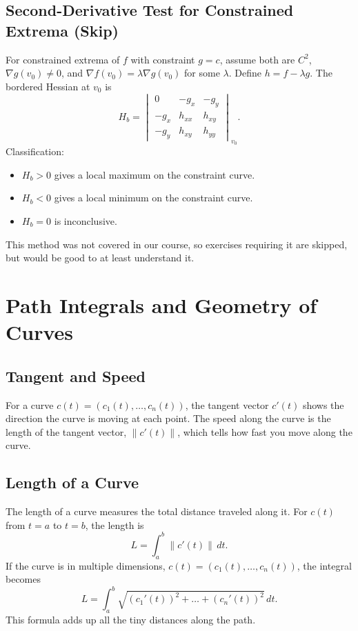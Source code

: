 \documentclass{article}
\begin{document}
\subsection{Second-Derivative Test for Constrained Extrema (Skip)}
For constrained extrema of $f$ with constraint $g=c$, assume both are $C^{2}$, $\nabla g(v_{0})\neq 0$, and $\nabla f(v_{0})=\lambda\nabla g(v_{0})$ for some $\lambda$. Define $h=f-\lambda g$. The bordered Hessian at $v_{0}$ is
\[H_b=\begin{vmatrix}0 & -g_x & -g_y \\-g_x & h_{xx} & h_{xy} \\-g_y & h_{xy} & h_{yy}\end{vmatrix}_{v_{0}}.\]
Classification:
\begin{itemize}
    \item $H_b>0$ gives a local maximum on the constraint curve.
    \item $H_b<0$ gives a local minimum on the constraint curve.
    \item $H_b=0$ is inconclusive.
\end{itemize}
This method was not covered in our course, so exercises requiring it are skipped, but would be good to at least understand it.

\section{Path Integrals and Geometry of Curves}

\subsection{Tangent and Speed}  
For a curve \(c(t) = (c_1(t), \dots, c_n(t))\), the tangent vector \(c'(t)\) shows the direction the curve is moving at each point. The speed along the curve is the length of the tangent vector, \(\|c'(t)\|\), which tells how fast you move along the curve.

\subsection{Length of a Curve}  
The length of a curve measures the total distance traveled along it. For \(c(t)\) from \(t = a\) to \(t = b\), the length is
\[L = \int_a^b \|c'(t)\| \, dt.\] 
If the curve is in multiple dimensions, \(c(t) = (c_1(t), \dots, c_n(t))\), the integral becomes
\[L = \int_a^b \sqrt{(c_1'(t))^2 + \dots + (c_n'(t))^2} \, dt.\]  
This formula adds up all the tiny distances along the path.
\end{document}
